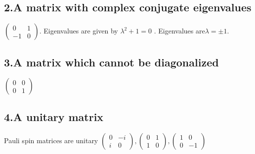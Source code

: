 \documentclass[12pt]{article}
\begin{document}
\subsection*{2.A matrix with complex conjugate eigenvalues}
\(
\begin{pmatrix} 0 & 1\\ -1& 0 \end{pmatrix} \). Eigenvalues are given by \( \lambda^2+1=0 \) . Eigenvalues are\( \lambda=\pm1\).
\subsection*{3.A matrix which cannot be diagonalized}
\(
\begin{pmatrix} 0&0 \\ 0&1 \end{pmatrix}
\)
\subsection*{4.A unitary matrix}

Pauli spin matrices are unitary
\(
\begin{pmatrix} 0 & -i\\ i& 0 \end{pmatrix}, \begin{pmatrix} 0 & 1\\ 1& 0 \end{pmatrix} , \begin{pmatrix} 1 & 0\\ 0& -1 \end{pmatrix}
\)
\end{document}
